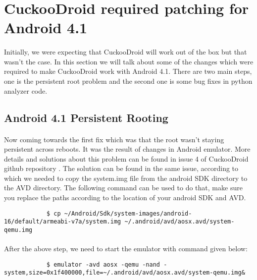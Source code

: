 \documentclass[../main.tex]{subfile}
\begin{document}
		\section{CuckooDroid required patching for Android 4.1}\label{sec:cuckoodroid_patching}
		\paragraph{} Initially, we were expecting that CuckooDroid will work out of the box but that wasn't the case. In this section we will talk about some of the changes which were required to make CuckooDroid work with Android 4.1. There are two main steps, one is the persistent root problem and the second one is some bug fixes in python analyzer code.
		
		\subsection{Android 4.1 Persistent Rooting}
		\paragraph{} Now coming towards the first fix which was that the root wasn't staying persistent across reboots. It was the result of changes in Android emulator. More details and solutions about this problem can be found in issue 4 of CuckooDroid github repository \cite{cuckoodroid_root_issue}. The solution can be found in the same issue, according to which we needed to copy the system.img file from the android SDK directory to the AVD directory. The following command can be used to do that, make sure you replace the paths according to the location of your android SDK and AVD.
		
		\begin{lstlisting}
			$ cp ~/Android/Sdk/system-images/android-16/default/armeabi-v7a/system.img ~/.android/avd/aosx.avd/system-qemu.img
		\end{lstlisting}
		
		\paragraph{} After the above step, we need to start the emulator with command given below:
		\begin{lstlisting}
			$ emulator -avd aosx -qemu -nand -system,size=0x1f400000,file=~/.android/avd/aosx.avd/system-qemu.img&
		\end{lstlisting}
		
\end{document}
